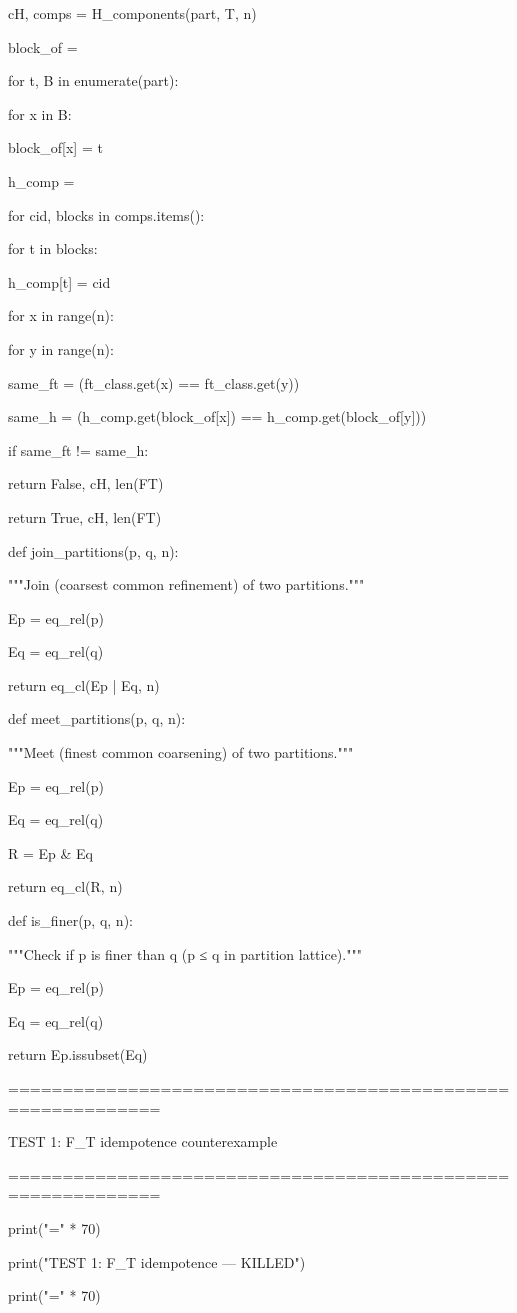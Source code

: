 cH, comps = H_components(part, T, n)

block_of = {}

for t, B in enumerate(part):

for x in B:

block_of[x] = t

h_comp = {}

for cid, blocks in comps.items():

for t in blocks:

h_comp[t] = cid

for x in range(n):

for y in range(n):

same_ft = (ft_class.get(x) == ft_class.get(y))

same_h = (h_comp.get(block_of[x]) == h_comp.get(block_of[y]))

if same_ft != same_h:

return False, cH, len(FT)

return True, cH, len(FT)


def join_partitions(p, q, n):

"""Join (coarsest common refinement) of two partitions."""

Ep = eq_rel(p)

Eq = eq_rel(q)

return eq_cl(Ep | Eq, n)


def meet_partitions(p, q, n):

"""Meet (finest common coarsening) of two partitions."""

Ep = eq_rel(p)

Eq = eq_rel(q)

R = Ep & Eq

return eq_cl(R, n)


def is_finer(p, q, n):

"""Check if p is finer than q (p ≤ q in partition lattice)."""

Ep = eq_rel(p)

Eq = eq_rel(q)

return Ep.issubset(Eq)


============================================================


TEST 1: F_T idempotence counterexample


============================================================


print("=" * 70)

print("TEST 1: F_T idempotence — KILLED")

print("=" * 70)


